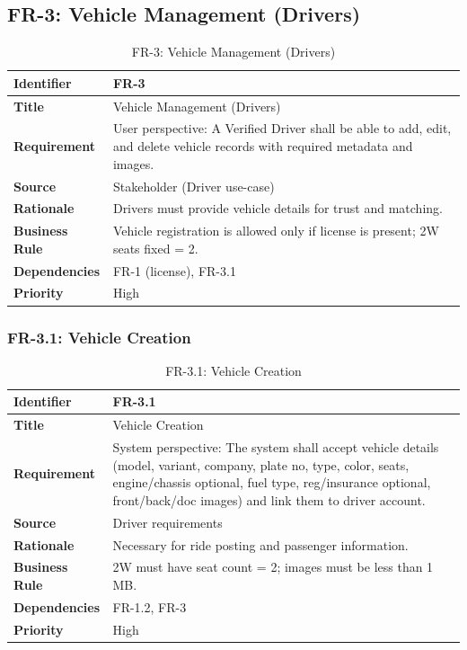 \subsection{FR-3: Vehicle Management (Drivers)}

\begin{longtable}{|p{3cm}|p{12cm}|}
\caption{FR-3: Vehicle Management (Drivers)}
\label{tab:fr-3} \\
\hline
\rowcolor{lightgray!30}
\textbf{Identifier} & FR-3 \\
\hline
\textbf{Title} & Vehicle Management (Drivers) \\
\hline
\textbf{Requirement} & User perspective: A Verified Driver shall be able to add, edit, and delete vehicle records with required metadata and images. \\
\hline
\textbf{Source} & Stakeholder (Driver use-case) \\
\hline
\textbf{Rationale} & Drivers must provide vehicle details for trust and matching. \\
\hline
\textbf{Business Rule} & Vehicle registration is allowed only if license is present; 2W seats fixed = 2. \\
\hline
\textbf{Dependencies} & FR-1 (license), FR-3.1 \\
\hline
\textbf{Priority} & High \\
\hline
\end{longtable}

\subsubsection{FR-3.1: Vehicle Creation}

\begin{longtable}{|p{3cm}|p{12cm}|}
\caption{FR-3.1: Vehicle Creation}
\label{tab:fr-3-1} \\
\hline
\rowcolor{lightgray!30}
\textbf{Identifier} & FR-3.1 \\
\hline
\textbf{Title} & Vehicle Creation \\
\hline
\textbf{Requirement} & System perspective: The system shall accept vehicle details (model, variant, company, plate no, type, color, seats, engine/chassis optional, fuel type, reg/insurance optional, front/back/doc images) and link them to driver account. \\
\hline
\textbf{Source} & Driver requirements \\
\hline
\textbf{Rationale} & Necessary for ride posting and passenger information. \\
\hline
\textbf{Business Rule} & 2W must have seat count = 2; images must be less than 1 MB. \\
\hline
\textbf{Dependencies} & FR-1.2, FR-3 \\
\hline
\textbf{Priority} & High \\
\hline
\end{longtable}

